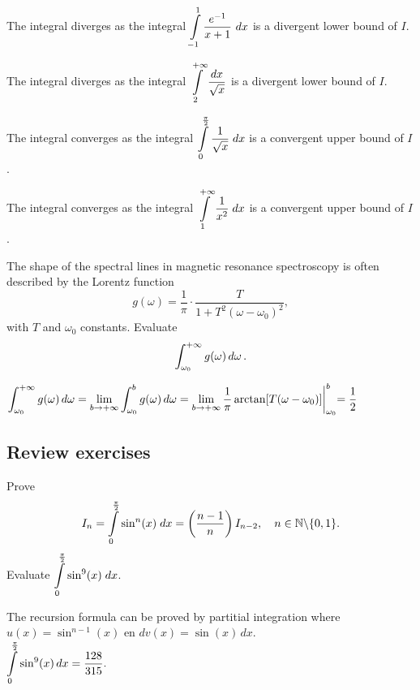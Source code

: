 \begin{Answer}
        \Question The integral diverges as the integral $\displaystyle \int\limits_{-1}^{1} \dfrac{e^{-1}}{x+1} \ dx$ is a divergent lower bound of $I$.
        	
        \Question The integral diverges as the integral $\displaystyle \int \limits_{2}^{+\infty} \dfrac{dx}{\sqrt{x}}$ is a divergent lower bound of $I$.
    	
        \Question The integral converges as the integral $\displaystyle \int\limits_0^{\frac{\pi}{2}} \dfrac{1}{\sqrt{x}} \; dx$ is a convergent upper bound of $I$.
     
    	\Question The integral converges as the integral $\displaystyle \int\limits_1^{+\infty} \dfrac{1}{x^2} \; dx $ is a convergent upper bound of $I$.
    	
    	\fi	
\end{Answer}


\begin{Exercise}[difficulty = 3] The shape of the spectral lines in magnetic resonance spectroscopy is often described by the Lorentz function 
\[g(\omega) = \dfrac{1}{\pi}\cdot\dfrac{T}{1+T^2(\omega-\omega_0)^2},\]
with $T$ and $\omega_0$ constants. Evaluate $$\displaystyle \int_{\omega_0}^{+\infty} g(\omega)\, d\omega\,.$$
\end{Exercise}

\begin{Answer}
    $\displaystyle \int_{\omega_0}^{+\infty} g(\omega)\, d\omega = \lim_{b\to +\infty}\int_{\omega_0}^b g(\omega)\, d\omega = \lim_{b\to +\infty} \dfrac{1}{\pi}\arctan[T(\omega-\omega_0)]\biggl|_{\omega_0}^b = \dfrac{1}{2}$
\end{Answer}





\subsection*{Review exercises}

\ifanalysis
\begin{Exercise}[difficulty = 2]
Prove 
\[ I_{n} = \displaystyle \int\limits_0^{\frac{\pi}{2}} \sin^n (x) \; dx = \left(\dfrac{n-1}{n} \right) I_{n-2}, \quad n \in \mathbb{N} \backslash \{0,1 \}.\]
Evaluate $\displaystyle \int\limits_{0}^{\frac{\pi}{2}} \sin^9 (x) \; dx$. \label{oef_recursieformule}
\end{Exercise}

\begin{Answer}
    The recursion formula can be proved by partitial integration where $u(x)=\sin^{n-1} (x)$ en $dv(x)=\sin (x)\, dx$. \\
$\displaystyle \int\limits_0^\frac{\pi}{2} \sin^9 (x)\, dx = \dfrac{128}{315}.$
\end{Answer}

